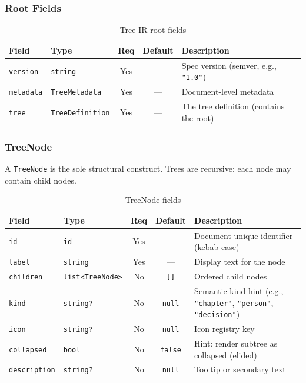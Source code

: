 \subsubsection{Root Fields}

\begin{table}[h]
\centering
\small
\begin{tabular}{llccp{4.8cm}}
\toprule
\textbf{Field} & \textbf{Type} & \textbf{Req} & \textbf{Default} & \textbf{Description} \\
\midrule
\texttt{version} & \texttt{string} & Yes & --- & Spec version (semver, e.g., \texttt{"1.0"}) \\
\texttt{metadata} & \texttt{TreeMetadata} & Yes & --- & Document-level metadata \\
\texttt{tree} & \texttt{TreeDefinition} & Yes & --- & The tree definition (contains the root) \\
\bottomrule
\end{tabular}
\caption{Tree IR root fields}
\label{tab:tree-root-fields}
\end{table}

\subsubsection{TreeNode}
\label{sec:tree-node}

A \texttt{TreeNode} is the sole structural construct. Trees are recursive: each node may contain child nodes.

\begin{table}[h]
\centering
\small
\begin{tabular}{llccp{4.0cm}}
\toprule
\textbf{Field} & \textbf{Type} & \textbf{Req} & \textbf{Default} & \textbf{Description} \\
\midrule
\texttt{id} & \texttt{id} & Yes & --- & Document-unique identifier (kebab-case) \\
\texttt{label} & \texttt{string} & Yes & --- & Display text for the node \\
\texttt{children} & \texttt{list<TreeNode>} & No & \texttt{[]} & Ordered child nodes \\
\texttt{kind} & \texttt{string?} & No & \texttt{null} & Semantic kind hint (e.g., \texttt{"chapter"}, \texttt{"person"}, \texttt{"decision"}) \\
\texttt{icon} & \texttt{string?} & No & \texttt{null} & Icon registry key \\
\texttt{collapsed} & \texttt{bool} & No & \texttt{false} & Hint: render subtree as collapsed (elided) \\
\texttt{description} & \texttt{string?} & No & \texttt{null} & Tooltip or secondary text \\
\bottomrule
\end{tabular}
\caption{TreeNode fields}
\label{tab:tree-node-fields}
\end{table}

